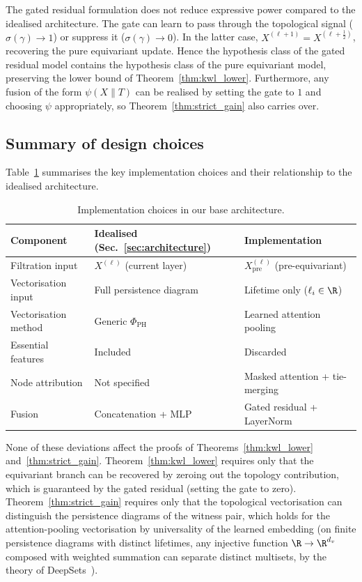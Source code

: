 \begin{remark}
The gated residual formulation does not reduce expressive power compared to the idealised architecture. The gate can learn to pass through the topological signal ($\sigma(\gamma) \to 1$) or suppress it ($\sigma(\gamma) \to 0$). In the latter case, $X^{(\ell+1)} = X^{(\ell+\frac{1}{2})}$, recovering the pure equivariant update. Hence the hypothesis class of the gated residual model contains the hypothesis class of the pure equivariant model, preserving the lower bound of Theorem~\ref{thm:kwl_lower}. Furthermore, any fusion of the form $\psi(X \| T)$ can be realised by setting the gate to $1$ and choosing $\psi$ appropriately, so Theorem~\ref{thm:strict_gain} also carries over.
\end{remark}

\subsection{Summary of design choices}

Table~\ref{tab:v3_summary} summarises the key implementation choices and their relationship to the idealised architecture.

\begin{table}[h]
\centering
\caption{Implementation choices in our base architecture.}
\label{tab:v3_summary}
\begin{tabular}{lll}
\toprule
\textbf{Component} & \textbf{Idealised (Sec.~\ref{sec:architecture})} & \textbf{Implementation} \\
\midrule
Filtration input & $X^{(\ell)}$ (current layer) & $X^{(\ell)}_{\mathrm{pre}}$ (pre-equivariant) \\
Vectorisation input & Full persistence diagram & Lifetime only ($\ell_i \in \R$) \\
Vectorisation method & Generic $\Phi_{\mathrm{PH}}$ & Learned attention pooling \\
Essential features & Included & Discarded \\
Node attribution & Not specified & Masked attention + tie-merging \\
Fusion & Concatenation + MLP & Gated residual + LayerNorm \\
\bottomrule
\end{tabular}
\end{table}

None of these deviations affect the proofs of Theorems~\ref{thm:kwl_lower} and~\ref{thm:strict_gain}. Theorem~\ref{thm:kwl_lower} requires only that the equivariant branch can be recovered by zeroing out the topology contribution, which is guaranteed by the gated residual (setting the gate to zero). Theorem~\ref{thm:strict_gain} requires only that the topological vectorisation can distinguish the persistence diagrams of the witness pair, which holds for the attention-pooling vectorisation by universality of the learned embedding (on finite persistence diagrams with distinct lifetimes, any injective function $\R \to \R^{d_v}$ composed with weighted summation can separate distinct multisets, by the theory of DeepSets~\cite{zaheer2017deep}).

